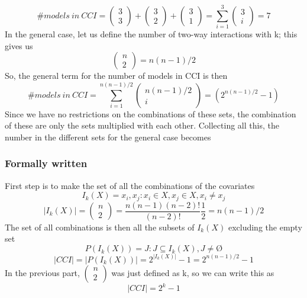 \noindent 
\[\#models\ in\ CCI=\left( \begin{array}{c}
3 \\ 
3 \end{array}
\right)+\left( \begin{array}{c}
3 \\ 
2 \end{array}
\right)+\left( \begin{array}{c}
3 \\ 
1 \end{array}
\right)=\sum^3_{i=1}{\left( \begin{array}{c}
3 \\ 
i \end{array}
\right)}=7\] 
In the general case, let us define the number of two-way interactions with k; this gives us
\[\left( \begin{array}{c}
n \\ 
2 \end{array}
\right)=n(n-1)/2\] 
So, the general term for the number of models in CCI is then
\[\#models\ in\ CCI=\sum^{n(n-1)/2}_{i=1}{\left( \begin{array}{c}
n(n-1)/2 \\ 
i \end{array}
\right)}=(2^{n(n-1)/2}-1)\] 
Since we have no restrictions on the combinations of these sets, the combination of these are only the sets multiplied with each other. Collecting all this, the number in the different sets for the general case becomes

\subsubsection{Formally written}
First step is to make the set of all the combinations of the covariates
\[I_k\left(X\right)=\left.\left.x_i,x_j\right.:x_i\in X,x_j\in X,x_i\neq x_j\right.\] 
\[\left|I_k\left(X\right)\right|=\left( \begin{array}{c}
n \\ 
2 \end{array}
\right)=\frac{n\left(n-1\right)\left(n-2\right)!}{\left(n-2\right)!}\frac{1}{2}=n(n-1)/2\] 
The set of all combinations is then all the subsets of $I_k\left(X\right)$ excluding the empty set
\[P\left(I_k\left(X\right)\right)=\left.J:J\subseteq I_k\left(X\right),J\neq \textrm{\O}\right.\] 
\[\left|CCI\right|=\left|P\left(I_k\left(X\right)\right)\right|=2^{\left|I_k\left(X\right)\right|}-1=2^{n(n-1)/2}-1\] 
In the previous part, $\left( \begin{array}{c}
n \\ 
2 \end{array}
\right)$ was just defined as k, so we can write this as
\[\left|CCI\right|=2^k-1\] \\

